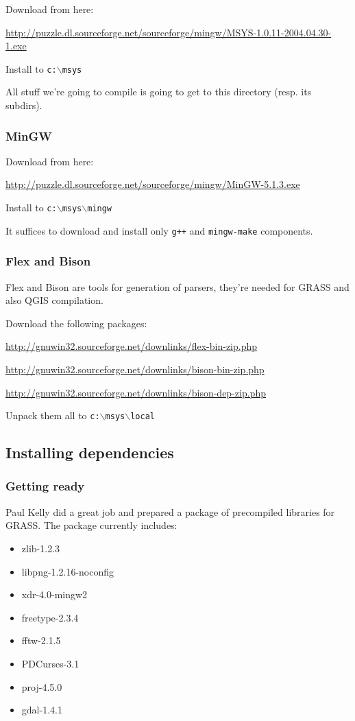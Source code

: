 Download from here:

\url{http://puzzle.dl.sourceforge.net/sourceforge/mingw/MSYS-1.0.11-2004.04.30-1.exe}

Install to \texttt{c:$\backslash$msys}

All stuff we're going to compile is going to get to this directory (resp. its subdirs).

\subsubsection{MinGW}
Download from here:

\url{http://puzzle.dl.sourceforge.net/sourceforge/mingw/MinGW-5.1.3.exe}

Install to \texttt{c:$\backslash$msys$\backslash$mingw}

It suffices to download and install only \texttt{g++} and \texttt{mingw-make} components.

\subsubsection{Flex and Bison}
Flex and Bison are tools for generation of parsers, they're needed for GRASS and also QGIS compilation.

Download the following packages:

\url{http://gnuwin32.sourceforge.net/downlinks/flex-bin-zip.php}

\url{http://gnuwin32.sourceforge.net/downlinks/bison-bin-zip.php}

\url{http://gnuwin32.sourceforge.net/downlinks/bison-dep-zip.php}

Unpack them all to \texttt{c:$\backslash$msys$\backslash$local}

\subsection{Installing dependencies}
\subsubsection{Getting ready}
Paul Kelly did a great job and prepared a package of precompiled libraries for GRASS.
The package currently includes:

\begin{itemize}
\item zlib-1.2.3
\item libpng-1.2.16-noconfig
\item xdr-4.0-mingw2
\item freetype-2.3.4
\item fftw-2.1.5
\item PDCurses-3.1
\item proj-4.5.0
\item gdal-1.4.1
\end{itemize}

